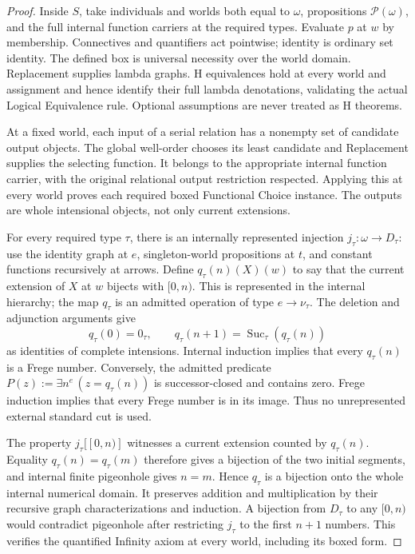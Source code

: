 \documentclass[11pt]{article}
\begin{document}
\begin{proof}
Inside $S$, take individuals and worlds both equal to $\omega$, propositions $\mathcal P(\omega)$, and the full internal function carriers at the required types. Evaluate $p$ at $w$ by membership. Connectives and quantifiers act pointwise; identity is ordinary set identity. The defined box is universal necessity over the world domain. Replacement supplies lambda graphs. H equivalences hold at every world and assignment and hence identify their full lambda denotations, validating the actual Logical Equivalence rule. Optional assumptions are never treated as H theorems.

At a fixed world, each input of a serial relation has a nonempty set of candidate output objects. The global well-order chooses its least candidate and Replacement supplies the selecting function. It belongs to the appropriate internal function carrier, with the original relational output restriction respected. Applying this at every world proves each required boxed Functional Choice instance. The outputs are whole intensional objects, not only current extensions.

For every required type $\tau$, there is an internally represented injection $j_\tau:\omega\to D_\tau$: use the identity graph at $e$, singleton-world propositions at $t$, and constant functions recursively at arrows. Define $q_\tau(n)(X)(w)$ to say that the current extension of $X$ at $w$ bijects with $[0,n)$. This is represented in the internal hierarchy; the map $q_\tau$ is an admitted operation of type $e\to\nu_\tau$. The deletion and adjunction arguments give
\[
 q_\tau(0)=0_\tau,\qquad
 q_\tau(n+1)=\operatorname{Suc}_\tau(q_\tau(n))
\]
as identities of complete intensions. Internal induction implies that every $q_\tau(n)$ is a Frege number. Conversely, the admitted predicate $P(z):=\exists n^e\,(z=q_\tau(n))$ is successor-closed and contains zero. Frege induction implies that every Frege number is in its image. Thus no unrepresented external standard cut is used.

The property $j_\tau[[0,n)]$ witnesses a current extension counted by $q_\tau(n)$. Equality $q_\tau(n)=q_\tau(m)$ therefore gives a bijection of the two initial segments, and internal finite pigeonhole gives $n=m$. Hence $q_\tau$ is a bijection onto the whole internal numerical domain. It preserves addition and multiplication by their recursive graph characterizations and induction. A bijection from $D_\tau$ to any $[0,n)$ would contradict pigeonhole after restricting $j_\tau$ to the first $n+1$ numbers. This verifies the quantified Infinity axiom at every world, including its boxed form.


\end{proof}
\end{document}

